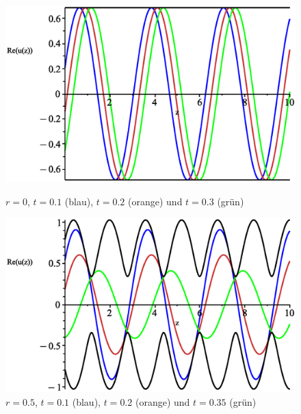 \documentclass[paper=a4, parskip=half-, ngerman, fontsize=11pt]{scrreprt}
\begin{document}
\begin{figure}[!htpb]
    \begin{minipage}{0.45\textwidth}
        \centering
        \includegraphics[width=\linewidth]{../graphics/Enveloppe/verlustlos/R0}
        \caption*{$r=0$, $t=0.1$ (blau), $t=0.2$ (orange) und $t=0.3$ (grün)}
    \end{minipage}\hfill
    \begin{minipage}{0.45\textwidth}
        \centering
        \includegraphics[width=\linewidth]{../graphics/Enveloppe/verlustlos/R0.5}
        \caption*{$r=0.5$, $t=0.1$ (blau), $t=0.2$ (orange) und $t=0.35$ (grün)}
    \end{minipage}

    \vspace{1ex}


\end{figure}
\end{document}
